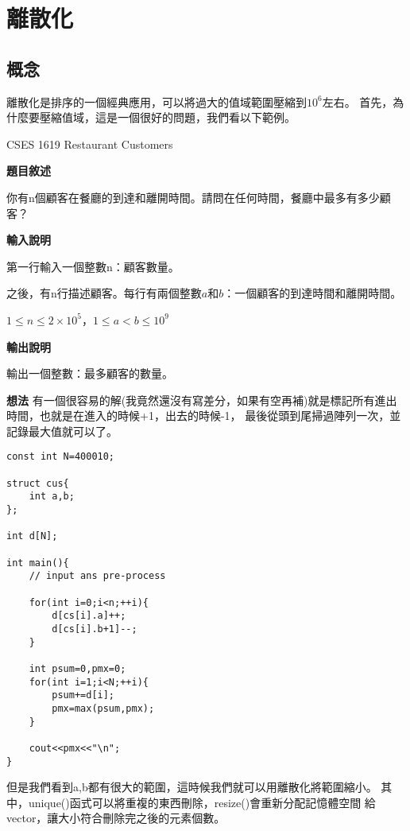 \section{離散化}
    \subsection{概念}
    離散化是排序的一個經典應用，可以將過大的值域範圍壓縮到$10^6$左右。
    首先，為什麼要壓縮值域，這是一個很好的問題，我們看以下範例。

    \example CSES 1619 Restaurant Customers

    \textbf{題目敘述}

    你有n個顧客在餐廳的到達和離開時間。請問在任何時間，餐廳中最多有多少顧客？

    \textbf{輸入說明}

    第一行輸入一個整數n：顧客數量。

    之後，有n行描述顧客。每行有兩個整數$a$和$b$：一個顧客的到達時間和離開時間。

    $1 \leq n \leq 2 \times 10^5$，$1 \leq a < b \leq 10^9$

    \textbf{輸出說明}

    輸出一個整數：最多顧客的數量。

    \textbf{想法}
    有一個很容易的解(我竟然還沒有寫差分，如果有空再補)就是標記所有進出時間，也就是在進入的時候+1，出去的時候-1，
    最後從頭到尾掃過陣列一次，並記錄最大值就可以了。

\begin{lstlisting}[caption=差分範例]
const int N=400010;

struct cus{
    int a,b;
};

int d[N];

int main(){
    // input ans pre-process
    
    for(int i=0;i<n;++i){
        d[cs[i].a]++;
        d[cs[i].b+1]--;
    }

    int psum=0,pmx=0;
    for(int i=1;i<N;++i){
        psum+=d[i];
        pmx=max(psum,pmx);
    }

    cout<<pmx<<"\n";
}
\end{lstlisting}

    但是我們看到a,b都有很大的範圍，這時候我們就可以用離散化將範圍縮小。
    其中，unique()函式可以將重複的東西刪除，resize()會重新分配記憶體空間
    給vector，讓大小符合刪除完之後的元素個數。

